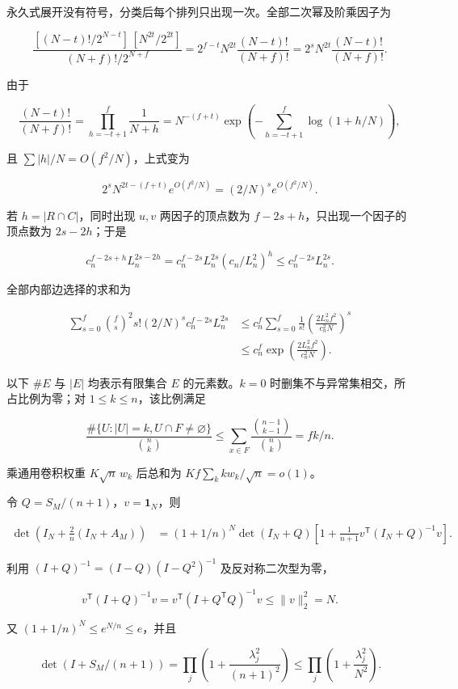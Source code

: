 \documentclass[11pt,a4paper]{article}
\begin{document}
永久式展开没有符号，分类后每个排列只出现一次。全部二次幂及阶乘因子为

\[\frac{[(N-t)!/2^{N-t}]\,[N^{2t}/2^{2t}]}{(N+f)!/2^{N+f}}
=2^{f-t}N^{2t}\frac{(N-t)!}{(N+f)!}
=2^sN^{2t}\frac{(N-t)!}{(N+f)!}.\]

由于

\[\frac{(N-t)!}{(N+f)!}=\prod_{h=-t+1}^{f}\frac1{N+h}
=N^{-(f+t)}\exp\left(-\sum_{h=-t+1}^{f}\log(1+h/N)\right),\]

且 \(\sum|h|/N=O(f^2/N)\)，上式变为

\[2^sN^{2t-(f+t)}e^{O(f^2/N)}=(2/N)^se^{O(f^2/N)}.\]

若 \(h=|R\cap C|\)，同时出现 \(u,v\) 两因子的顶点数为 \(f-2s+h\)，只出现一个因子的顶点数为 \(2s-2h\)；于是

\[c_n^{f-2s+h}L_n^{2s-2h}
=c_n^{f-2s}L_n^{2s}(c_n/L_n^2)^h
\le c_n^{f-2s}L_n^{2s}.\]

全部内部边选择的求和为

\[\begin{aligned}
\sum_{s=0}^f\binom fs^2s!(2/N)^sc_n^{f-2s}L_n^{2s}
&\le c_n^f\sum_{s=0}^f\frac1{s!}
\left(\frac{2L_n^2f^2}{c_n^2N}\right)^s\\
&\le c_n^f\exp\left(\frac{2L_n^2f^2}{c_n^2N}\right).
\end{aligned}\]

以下 \(\#E\) 与 \(|E|\) 均表示有限集合 \(E\) 的元素数。\(k=0\) 时删集不与异常集相交，所占比例为零；对 \(1\le k\le n\)，该比例满足

\[\frac{\#\{U:|U|=k,U\cap F\ne\varnothing\}}{\binom nk}
\le\sum_{x\in F}\frac{\binom{n-1}{k-1}}{\binom nk}=fk/n.\]

乘通用卷积权重 \(K\sqrt n\,w_k\) 后总和为 \(Kf\sum_kkw_k/\sqrt n=o(1)\)。

令 \(Q=S_M/(n+1)\)，\(v=\mathbf1_N\)，则

\[\begin{aligned}
\det\left(I_N+\frac2n(I_N+A_M)\right)
&=(1+1/n)^N\det(I_N+Q)
\left[1+\frac1{n+1}v^{\mathsf T}(I_N+Q)^{-1}v\right].
\end{aligned}\]

利用 \((I+Q)^{-1}=(I-Q)(I-Q^2)^{-1}\) 及反对称二次型为零，

\[v^{\mathsf T}(I+Q)^{-1}v=v^{\mathsf T}(I+Q^{\mathsf T}Q)^{-1}v\le\|v\|_2^2=N.\]

又 \((1+1/n)^N\le e^{N/n}\le e\)，并且

\[\det(I+S_M/(n+1))=\prod_j\left(1+\frac{\lambda_j^2}{(n+1)^2}\right)
\le\prod_j\left(1+\frac{\lambda_j^2}{N^2}\right).\]
\end{document}
